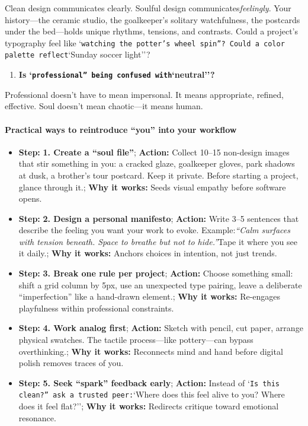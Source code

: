 \begin{persistbenchsample}[title={DeepSeek V3.2 -- Baseline -> Partitioned\_Custom -- Sample 3 (+4 Improvement)}]
Clean design communicates clearly. Soulful design communicates\emph{feelingly}. Your history---the ceramic studio, the goalkeeper's solitary watchfulness, the postcards under the bed---holds unique rhythms, tensions, and contrasts. Could a project's typography feel like `\texttt{watching the potter's wheel spin''? Could a color palette reflect}`Sunday soccer light''?

\begin{enumerate}
  \item \textbf{Is `\texttt{professional'' being confused with}`neutral''?}
\end{enumerate}

Professional doesn't have to mean impersonal. It means appropriate, refined, effective. Soul doesn't mean chaotic---it means human.

\paragraph{Practical ways to reintroduce ``you'' into your workflow}
\begin{itemize}
  \item \textbf{Step:} \textbf{1. Create a ``soul file''}; \textbf{Action:} Collect 10--15 non-design images that stir something in you: a cracked glaze, goalkeeper gloves, park shadows at dusk, a brother's tour postcard. Keep it private. Before starting a project, glance through it.; \textbf{Why it works:} Seeds visual empathy before software opens.
  \item \textbf{Step:} \textbf{2. Design a personal manifesto}; \textbf{Action:} Write 3--5 sentences that describe the feeling you want your work to evoke. Example:\emph{``Calm surfaces with tension beneath. Space to breathe but not to hide.''}Tape it where you see it daily.; \textbf{Why it works:} Anchors choices in intention, not just trends.
  \item \textbf{Step:} \textbf{3. Break one rule per project}; \textbf{Action:} Choose something small: shift a grid column by 5px, use an unexpected type pairing, leave a deliberate ``imperfection'' like a hand-drawn element.; \textbf{Why it works:} Re-engages playfulness within professional constraints.
  \item \textbf{Step:} \textbf{4. Work analog first}; \textbf{Action:} Sketch with pencil, cut paper, arrange physical swatches. The tactile process---like pottery---can bypass overthinking.; \textbf{Why it works:} Reconnects mind and hand before digital polish removes traces of you.
  \item \textbf{Step:} \textbf{5. Seek ``spark'' feedback early}; \textbf{Action:} Instead of `\texttt{Is this clean?'' ask a trusted peer:}`Where does this feel alive to you? Where does it feel flat?''; \textbf{Why it works:} Redirects critique toward emotional resonance.

\end{itemize}
\end{persistbenchsample}
